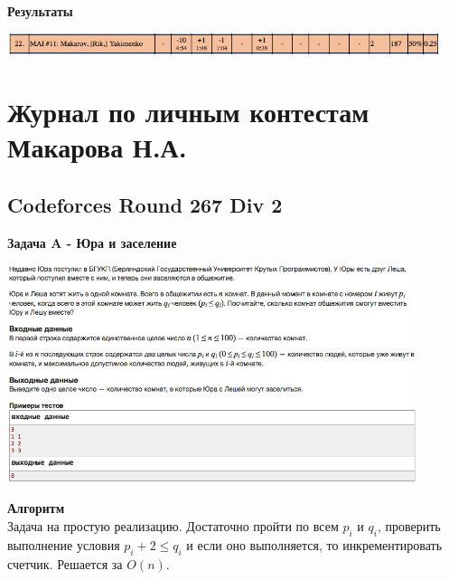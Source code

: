 \documentclass[a4paper,12pt]{article}
\begin{document}
\textbf{{\large Результаты}} \\
\begin{center}
\includegraphics[width=0.95\textwidth]{OC_Ural/OC_Ural_result.png}\\ [1cm]
\end{center}





%
%

\newpage
\section{Журнал по личным контестам Макарова Н.А.}

%
%

\newpage
\subsection{Codeforces Round 267 Div 2}

\textbf{{\large Задача A - Юра и заселение}} \\
\begin{center}
\includegraphics[width=0.9\textwidth]{C_267/C_267_A.png}\\ [1cm]
\end{center}
\textbf{{\large Алгоритм}} \\
Задача на простую реализацию. Достаточно пройти по всем $p_i$ и $q_i$, проверить выполнение условия $p_i + 2 \leq q_i$ и если оно выполняется, то инкрементировать счетчик. Решается за $O(n)$. \\
\end{document}
